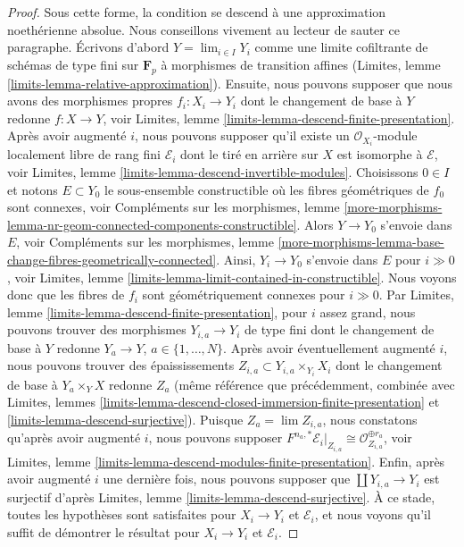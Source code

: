 \begin{proof}
\medskip\noindent
Sous cette forme, la condition se descend à une approximation
noethérienne absolue. Nous conseillons vivement au lecteur de sauter
ce paragraphe. Écrivons d'abord $Y = \lim_{i \in I} Y_i$ comme une limite cofiltrante
de schémas de type fini sur $\mathbf{F}_p$ à morphismes de transition
affines (Limites, lemme \ref{limits-lemma-relative-approximation}).
Ensuite, nous pouvons supposer que nous avons des morphismes propres $f_i : X_i \to Y_i$
dont le changement de base à $Y$ redonne $f : X \to Y$, voir
Limites, lemme \ref{limits-lemma-descend-finite-presentation}.
Après avoir augmenté $i$, nous pouvons supposer qu'il existe un
$\mathcal{O}_{X_i}$-module localement libre de rang fini $\mathcal{E}_i$ dont le tiré en arrière
sur $X$ est isomorphe à $\mathcal{E}$, voir
Limites, lemme \ref{limits-lemma-descend-invertible-modules}.
Choisissons $0 \in I$ et notons $E \subset Y_0$ le sous-ensemble constructible
où les fibres géométriques de $f_0$ sont connexes, voir
Compléments sur les morphismes, lemme
\ref{more-morphisms-lemma-nr-geom-connected-components-constructible}.
Alors $Y \to Y_0$ s'envoie dans $E$, voir
Compléments sur les morphismes, lemme
\ref{more-morphisms-lemma-base-change-fibres-geometrically-connected}.
Ainsi, $Y_i \to Y_0$ s'envoie dans $E$ pour $i \gg 0$, voir
Limites, lemme \ref{limits-lemma-limit-contained-in-constructible}.
Nous voyons donc que les fibres de $f_i$ sont géométriquement connexes
pour $i \gg 0$. Par Limites, lemme \ref{limits-lemma-descend-finite-presentation},
pour $i$ assez grand, nous pouvons trouver des morphismes
$Y_{i, a} \to Y_i$ de type fini dont le changement de base à $Y$
redonne $Y_a \to Y$, $a  \in \{1, \ldots, N\}$.
Après avoir éventuellement augmenté $i$, nous pouvons trouver des épaississements
$Z_{i, a} \subset Y_{i, a} \times_{Y_i} X_i$ dont le changement de base
à $Y_a \times_Y X$ redonne $Z_a$ (même référence que précédemment,
combinée avec
Limites, lemmes
\ref{limits-lemma-descend-closed-immersion-finite-presentation} et
\ref{limits-lemma-descend-surjective}).
Puisque $Z_a = \lim Z_{i, a}$, nous constatons qu'après avoir augmenté $i$, nous pouvons supposer
$F^{n_a, *}\mathcal{E}_i|_{Z_{i, a}} \cong
\mathcal{O}_{Z_{i, a}}^{\oplus r_a}$, voir
Limites, lemme \ref{limits-lemma-descend-modules-finite-presentation}.
Enfin, après avoir augmenté $i$ une dernière fois, nous pouvons supposer que
$\coprod Y_{i, a} \to Y_i$ est surjectif d'après
Limites, lemme \ref{limits-lemma-descend-surjective}.
À ce stade, toutes les hypothèses sont satisfaites pour $X_i \to Y_i$
et $\mathcal{E}_i$, et nous voyons qu'il suffit de démontrer le résultat
pour $X_i \to Y_i$ et $\mathcal{E}_i$.


\end{proof}
